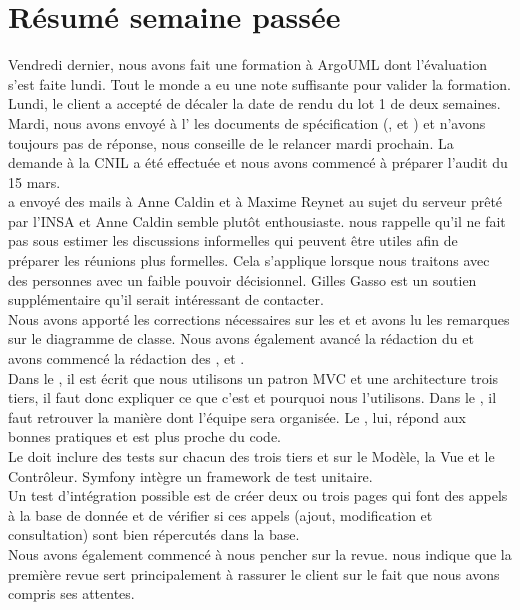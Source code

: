 \documentclass [a4paper] {article}
\begin{document}
\section{Résumé semaine passée}
Vendredi dernier, nous avons fait une formation à ArgoUML dont l'évaluation s'est faite lundi. Tout le monde a eu une note suffisante pour valider la formation. Lundi, le client a accepté de décaler la date de rendu du lot 1 de deux semaines. Mardi, nous avons envoyé à l'\nomClient{} les documents de spécification (\DSE{}, \DSI{} et \PTV{}) et n'avons toujours pas de réponse, \nomTuteurPedago{} nous conseille de le relancer mardi prochain. La demande à la CNIL a été effectuée et nous avons commencé à préparer l'audit du 15 mars.\\
\Sergi{} a envoyé des mails à Anne Caldin et à Maxime Reynet au sujet du serveur prêté par l'INSA et Anne Caldin semble plutôt enthousiaste. \nomTuteurPedago{} nous rappelle qu'il ne fait pas sous estimer les discussions informelles qui peuvent être utiles afin de préparer les réunions plus formelles. Cela s'applique lorsque nous traitons avec des personnes avec un faible pouvoir décisionnel. Gilles Gasso est un soutien supplémentaire qu'il serait intéressant de contacter.\\
Nous avons apporté les corrections nécessaires sur les \DSI{} et \PTV{} et avons lu les remarques sur le diagramme de classe. Nous avons également avancé la rédaction du \DCP{} et avons commencé la rédaction des \DCD{}, \PTI{} et \PTU{}. \\
Dans le \DSI{}, il est écrit que nous utilisons un patron MVC et une architecture trois tiers, il faut donc expliquer ce que c'est et pourquoi nous l'utilisons. Dans le \DCP{}, il faut retrouver la manière dont l'équipe sera organisée. Le \DCD{}, lui, répond aux bonnes pratiques et est plus proche du code. \\
Le \PTV{} doit inclure des tests sur chacun des trois tiers et sur le Modèle, la Vue et le Contrôleur. Symfony intègre un framework de test unitaire. \\
Un test d'intégration possible est de créer deux ou trois pages qui font des appels à la base de donnée et de vérifier si ces appels (ajout, modification et consultation) sont bien répercutés dans la base. \\
Nous avons également commencé à nous pencher sur la revue. \nomTuteurPedago{} nous indique que la première revue sert principalement à rassurer le client sur le fait que nous avons compris ses attentes.
\end{document}
